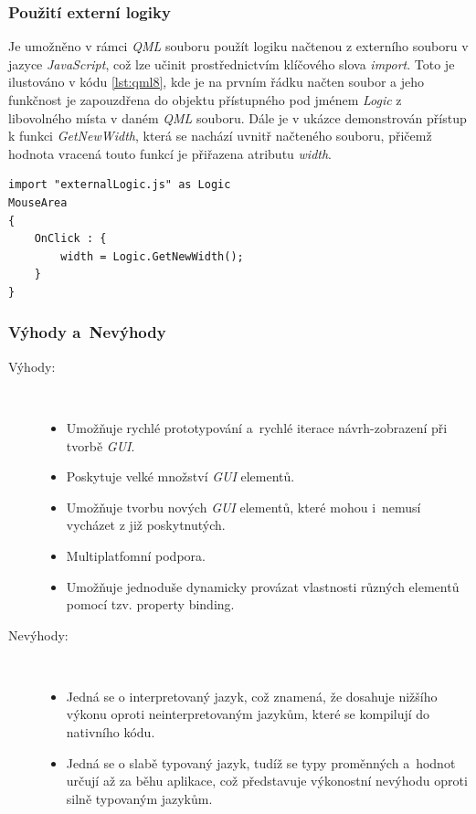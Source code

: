 \documentclass[11pt,twoside,a4paper]{book}
\begin{document}
\subsubsection{Použití externí logiky}
Je umožněno v rámci \textit{QML} souboru použít logiku načtenou z externího souboru v jazyce \textit{JavaScript}, což lze učinit prostřednictvím klíčového slova \textit{import}.  Toto je ilustováno v kódu \ref{lst:qml8}, kde je na prvním řádku načten soubor  a jeho funkčnost je zapouzdřena do objektu přístupného pod jménem \textit{Logic} z libovolného místa v daném \textit{QML} souboru. Dále je v ukázce demonstrován přístup k funkci \textit{GetNewWidth}, která se nachází uvnitř načteného souboru, přičemž hodnota vracená touto funkcí je přiřazena atributu \textit{width}.
\begin{lstlisting}[frame=single,caption=Použití externí logiky v jazyce \textit{QML}.,label=lst:qml8]
import "externalLogic.js" as Logic
MouseArea
{
	OnClick : {
		width = Logic.GetNewWidth();
	}
}
\end{lstlisting}

\subsubsection{Výhody a~Nevýhody}
\begin{description}
\item[Výhody:] ~
\begin{itemize}
  \item Umožňuje rychlé prototypování a~rychlé iterace návrh-zobrazení při tvorbě \textit{GUI}.
  \item Poskytuje velké množství \textit{GUI} elementů.
  \item Umožňuje tvorbu nových \textit{GUI} elementů, které mohou i~nemusí vycházet z již poskytnutých.
  \item Multiplatfomní podpora.
  \item Umožňuje jednoduše dynamicky provázat vlastnosti různých elementů pomocí tzv. property binding.
\end{itemize}
\item[Nevýhody:] ~
\begin{itemize}
  \item Jedná se o interpretovaný jazyk, což znamená, že dosahuje nižšího výkonu oproti neinterpretovaným jazykům, které se kompilují do nativního kódu.
  \item Jedná se o slabě typovaný jazyk, tudíž se typy proměnných a~hodnot určují až za běhu aplikace, což představuje výkonostní nevýhodu oproti silně typovaným jazykům.
\end{itemize}
\end{description}
\end{document}
